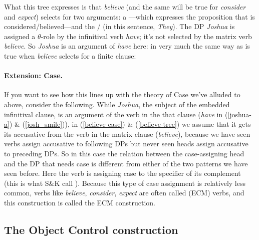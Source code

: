 \documentclass{article}
\begin{document}
What this tree expresses is that \emph{believe} (and the same will be true for \emph{consider} and \emph{expect}) selects for two arguments: a ---which expresses the proposition that is considered/believed---and the / (in this sentence, \emph{They}). 
The DP \emph{Joshua} is assigned a $\theta$-role by the infinitival verb \emph{have}; it's not selected by the matrix verb \emph{believe}.
So \emph{Joshua} is an argument of \emph{have} here: in very much the same way as is true when \emph{believe} selects for a finite clause:
\begin{exe}
    \label{josh_smile}
\end{exe}

\paragraph{Extension: Case.} If you want to see how this lines up with the theory of Case we've alluded to above, consider the following. While \emph{Joshua}, the subject of the embedded infinitival clause, is an argument of the verb in the that clause (\emph{have} in (\ref{joshua-a}) \& (\ref{josh_smile})), in (\ref{believe-case}) \& (\ref{believe-tree}) we assume that it gets its accusative  from the verb in the matrix clause (\emph{believe}), because we have seen verbs assign accusative to following DPs but never seen  heads assign accusative to preceding DPs.
So in this case the relation between the case-assigning head and the DP that needs case is different from either of the two patterns we have seen before.
Here the verb is assigning case to the specifier of its complement (this is what S\&K call ).
Because this type of case assignment is relatively less common, verbs like \emph{believe}, \emph{consider}, \emph{expect} are often called  (ECM) verbs, and this construction is called the ECM construction.

\subsection{The Object Control construction}
\end{document}
